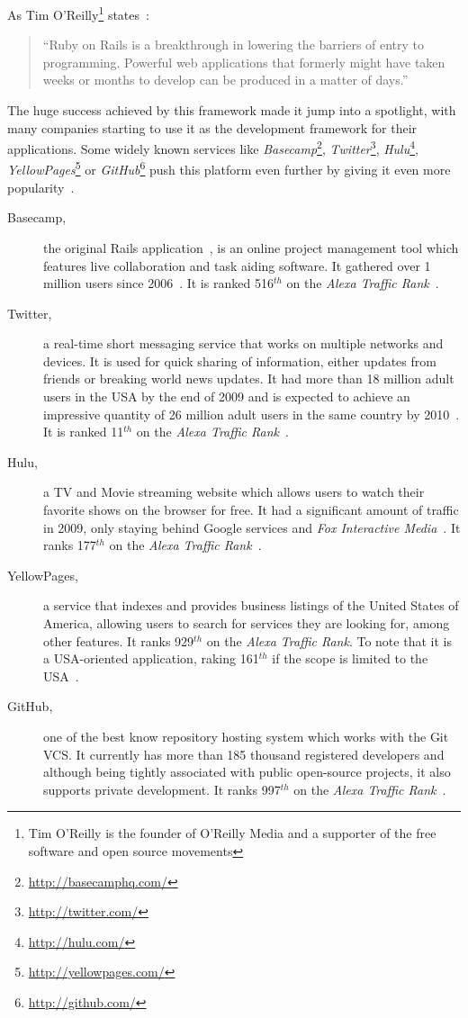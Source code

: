 As Tim O'Reilly\footnote{Tim O'Reilly is the founder of O'Reilly Media and a supporter of the free software and open source movements} states~\cite{oreilly_ror}:
\begin{quote}
  ``Ruby on Rails is a breakthrough in lowering the barriers of entry to programming. Powerful web applications that formerly might have taken weeks or months to develop can be produced in a matter of days.''
\end{quote}
The huge success achieved by this framework made it jump into a spotlight, with many companies starting to use it as the development framework for their applications. Some widely known services like \textit{Basecamp}\footnote{\url{http://basecamphq.com/}}, \textit{Twitter}\footnote{\url{http://twitter.com/}}, \textit{Hulu}\footnote{\url{http://hulu.com/}}, \textit{YellowPages}\footnote{\url{http://yellowpages.com/}} or \textit{GitHub}\footnote{\url{http://github.com/}} push this platform even further by giving it even more popularity~\cite{rubyonrails_applications}.
\begin{description}
  \item[Basecamp,] the original Rails application~\cite{rubyonrails_applications}, is an online project management tool which features live collaboration and task aiding software. It gathered over 1 million users since 2006~\cite{basecamp_turns_1000000}. It is ranked 516$^{th}$ on the \textit{Alexa Traffic Rank}~\cite{alexa}.
  \item[Twitter,] a real-time short messaging service that works on multiple networks and devices. It is used for quick sharing of information, either updates from friends or breaking world news updates. It had more than 18 million adult users in the USA by the end of 2009 and is expected to achieve an impressive quantity of 26 million adult users in the same country by 2010~\cite{emarketer_twitter_usage}. It is ranked 11$^{th}$ on the \textit{Alexa Traffic Rank}~\cite{alexa}.
  \item[Hulu,] a TV and Movie streaming website which allows users to watch their favorite shows on the browser for free. It had a significant amount of traffic in 2009, only staying behind Google services and \textit{Fox Interactive Media}~\cite{hulu_growth}. It ranks 177$^{th}$ on the \textit{Alexa Traffic Rank}~\cite{alexa}.
  \item[YellowPages,] a service that indexes and provides business listings of the United States of America, allowing users to search for services they are looking for, among other features. It ranks 929$^{th}$ on the \textit{Alexa Traffic Rank}. To note that it is a USA-oriented application, raking 161$^{th}$ if the scope is limited to the USA~\cite{alexa}.
  \item[GitHub,] one of the best know repository hosting system which works with the Git VCS. It currently has more than 185 thousand registered developers and although being tightly associated with public open-source projects, it also supports private development. It ranks 997$^{th}$ on the \textit{Alexa Traffic Rank}~\cite{alexa}.
\end{description}
